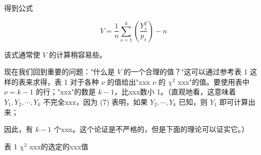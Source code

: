 \noindent 得到公式

\begin{equation}
V = \frac{1}{n} \sum_{s=1}^{k} \left( \frac{Y_s^2}{p_s} \right) - n \tag{8}
\end{equation}

该式通常使 $V$ 的计算稍容易些。

现在我们回到重要的问题："什么是 $V$ 的一个合理的值？"这可以通过参考表 1 这样的表来求得，表 1 对于各种 $\nu$ 的值给出"xxx $\nu$ 的 $\chi^2$ xxx"的值。要使用表中 $\nu = k - 1$ 的行；"xxx"的数是 $k-1$，比xxx数小 1。（直观地看，这意味着 $Y_1, Y_2, \cdots, Y_k$ 不完全xxx，因为 (7) 表明，如果 $Y_2, \cdots, Y_k$ 已知，则 $Y_1$ 即可计算出来；

\noindent 因此，有 $k-1$ 个xxx。这个论证是不严格的，但是下面的理论可以证实它。）

\begin{center}
表 1 \quad $\chi^2$ xxx的选定的xxx值
\end{center}

